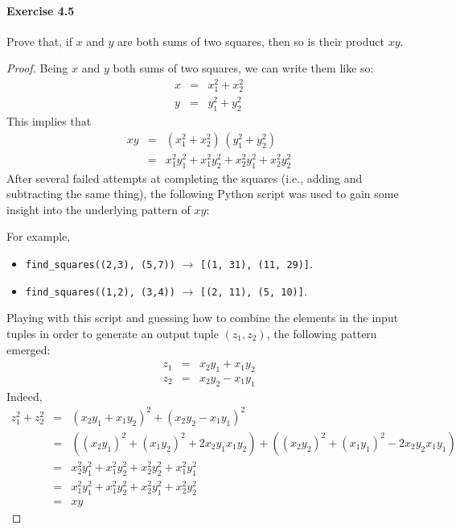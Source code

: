 \paragraph{Exercise 4.5}
Prove that, if $x$ and $y$ are both sums of two squares, then so is their
product $xy$.

\begin{proof}
Being $x$ and $y$ both sums of two squares, we can write them like so:
\begin{eqnarray*}
    x &=& x_1^2 + x_2^2 \\
    y &=& y_1^2 + y_2^2
\end{eqnarray*}
This implies that
\begin{eqnarray*}
    xy &=& (x_1^2 + x_2^2) \, (y_1^2 + y_2^2)  \\
       &=& x_1^2 y_1^2 + x_1^2 y_2^2 + x_2^2 y_1^2 + x_2^2 y_2^2
\end{eqnarray*}
After several failed attempts at completing the squares (i.e., adding and
subtracting the same thing), the following Python
script was used to gain some insight into the underlying pattern of $xy$:
    \begin{center}
    \framebox[8.5cm]{
    \usebox\sqpython}
    \end{center}
For example, 
\begin{itemize}
    \item \texttt{find\_squares((2,3), (5,7))} $\rightarrow$ \texttt{[(1, 31), (11, 29)]}.
    \item \texttt{find\_squares((1,2), (3,4))} $\rightarrow$ \texttt{[(2, 11), (5, 10)]}.
\end{itemize}
Playing with this script and guessing how to combine the elements in the input
tuples in order to generate an output tuple $(z_1, z_2)$, the following
pattern emerged: 
\begin{eqnarray*}
    z_1 &=& x_2 y_1 + x_1 y_2  \\
    z_2 &=& x_2 y_2 - x_1 y_1
\end{eqnarray*}
Indeed,
\begin{eqnarray*}
    z_1^2 + z_2^2 &=& (x_2 y_1 + x_1 y_2)^2 + (x_2 y_2 - x_1 y_1)^2  \\
                  &=& ((x_2 y_1)^2 + (x_1 y_2)^2 + 2 x_2 y_1 x_1 y_2)
                      + ((x_2 y_2)^2 + (x_1 y_1)^2 - 2 x_2 y_2 x_1 y_1) \\
                  &=& x_2^2 y_1^2 + x_1^2 y_2^2 + x_2^2 y_2^2 + x_1^2 y_1^2 \\
                  &=& x_1^2 y_1^2 + x_1^2 y_2^2 + x_2^2 y_1^2 + x_2^2 y_2^2 \\
                  &=& xy
\end{eqnarray*}

\end{proof}
